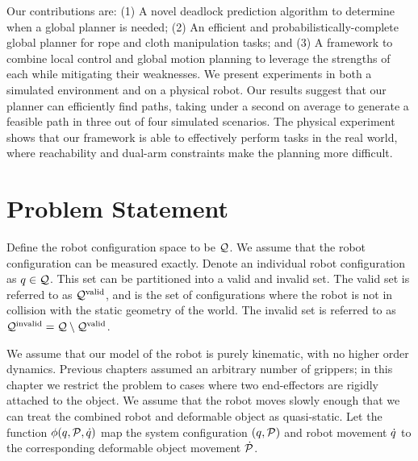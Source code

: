 Our contributions are: (1) A novel deadlock prediction algorithm to determine when a global planner is needed; (2) An efficient and probabilistically-complete global planner for rope and cloth manipulation tasks; and (3) A framework to combine local control and global motion planning to leverage the strengths of each while mitigating their weaknesses. We present experiments in both a simulated environment and on a physical robot. Our results suggest that our planner can efficiently find paths, taking under a second on average to generate a feasible path in three out of four simulated scenarios. The physical experiment shows that our framework is able to effectively perform tasks in the real world, where reachability and dual-arm constraints make the planning more difficult.


\section{Problem Statement}
\label{sec:main_problem_statement}

Define the robot configuration space to be $\mathcal{Q}$. We assume that the robot configuration can be measured exactly. Denote an individual robot configuration as $q \in \mathcal{Q}$. This set can be partitioned into a valid and invalid set. The valid set is referred to as $\mathcal{Q}^{\textrm{valid}}$, and is the set of configurations where the robot is not in collision with the static geometry of the world. The invalid set is referred to as $\mathcal{Q}^{\textrm{invalid}} = \mathcal{Q} \setminus \mathcal{Q}^{\textrm{valid}}$.

We assume that our model of the robot is purely kinematic, with no higher order dynamics. Previous chapters assumed an arbitrary number of grippers; in this chapter we restrict the problem to cases where two end-effectors are rigidly attached to the object. We assume that the robot moves slowly enough that we can treat the combined robot and deformable object as quasi-static. Let the function $\phi(q, \mathcal{P}, \dot{q})$ map the system configuration $(q, \mathcal{P})$ and robot movement $\dot{q}$ to the corresponding deformable object movement $\dot{\mathcal{P}}$.

